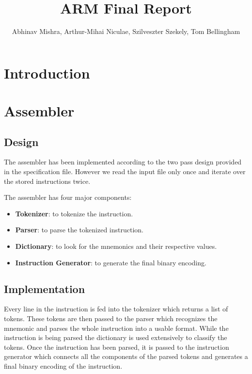 \documentclass[11pt]{article}
\begin{document}
\title{ARM Final Report}
\author{
  Abhinav Mishra,
  Arthur-Mihai Niculae,
  Szilveszter Szekely,
  Tom Bellingham
}

\maketitle

\section{Introduction}

\section{Assembler}

\subsection{Design}

The assembler has been implemented according to the two pass design provided in
the specification file. However we read the input file only once and iterate
over the stored instructions twice.

The assembler has four major components:
\begin{itemize}[noitemsep,topsep=0pt]
  \item \textbf{Tokenizer}:
    to tokenize the instruction.
  \item \textbf{Parser}:
    to parse the tokenized instruction.
  \item \textbf{Dictionary}:
    to look for the mnemonics and their respective values.
  \item \textbf{Instruction Generator}:
    to generate the final binary encoding.
\end{itemize}

\subsection{Implementation}

Every line in the instruction is fed into the tokenizer which returns a list
of tokens. These tokens are then passed to the parser which recognizes the
mnemonic and parses the whole instruction into a usable format. While the
instruction is being parsed the dictionary is used extensively to classify the
tokens. Once the instruction has been parsed, it is passed to the instruction
generator which connects all the components of the parsed tokens and generates
a final binary encoding of the instruction.
\end{document}
